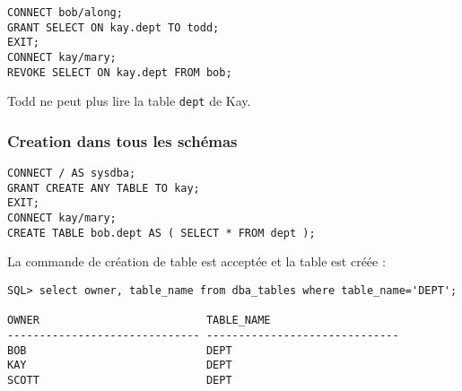 \begin{verbatim}
CONNECT bob/along;
GRANT SELECT ON kay.dept TO todd;
EXIT;
CONNECT kay/mary;
REVOKE SELECT ON kay.dept FROM bob;
\end{verbatim}

Todd ne peut plus lire la table \texttt{dept} de Kay.

\subsubsection{Creation dans tous les schémas}

\begin{verbatim}
CONNECT / AS sysdba;
GRANT CREATE ANY TABLE TO kay;
EXIT;
CONNECT kay/mary;
CREATE TABLE bob.dept AS ( SELECT * FROM dept );
\end{verbatim}

La commande de création de table est acceptée et la table est créée :
\begin{verbatim}
SQL> select owner, table_name from dba_tables where table_name='DEPT';

OWNER                          TABLE_NAME                                       
------------------------------ ------------------------------                   
BOB                            DEPT                                             
KAY                            DEPT                                             
SCOTT                          DEPT                                             
\end{verbatim}
